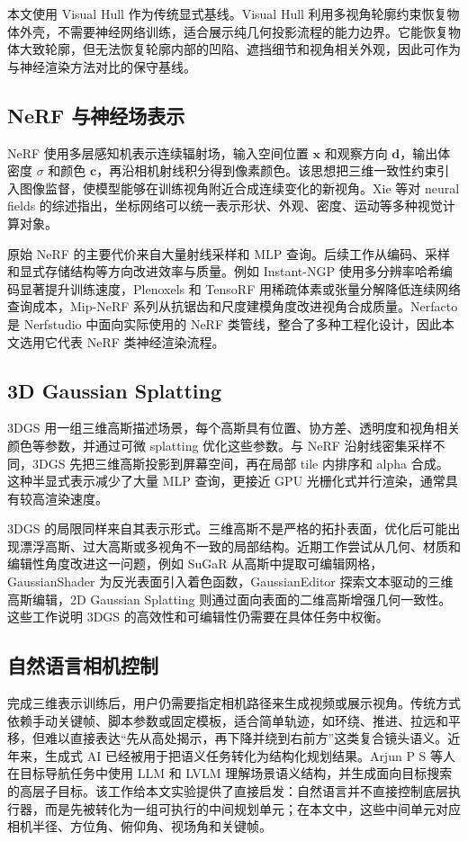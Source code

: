 \documentclass[a4paper, 12pt, centering]{article}
\begin{document}
本文使用 Visual Hull 作为传统显式基线。Visual Hull 利用多视角轮廓约束恢复物体外壳，不需要神经网络训练，适合展示纯几何投影流程的能力边界。它能恢复物体大致轮廓，但无法恢复轮廓内部的凹陷、遮挡细节和视角相关外观，因此可作为与神经渲染方法对比的保守基线。

\subsection{NeRF 与神经场表示}
NeRF 使用多层感知机表示连续辐射场，输入空间位置 $\mathbf{x}$ 和观察方向 $\mathbf{d}$，输出体密度 $\sigma$ 和颜色 $\mathbf{c}$，再沿相机射线积分得到像素颜色\cite{mildenhall2020nerf}。该思想把三维一致性约束引入图像监督，使模型能够在训练视角附近合成连续变化的新视角。Xie 等对 neural fields 的综述指出，坐标网络可以统一表示形状、外观、密度、运动等多种视觉计算对象\cite{xie2022neuralfields}。

原始 NeRF 的主要代价来自大量射线采样和 MLP 查询。后续工作从编码、采样和显式存储结构等方向改进效率与质量。例如 Instant-NGP 使用多分辨率哈希编码显著提升训练速度\cite{muller2022instant}，Plenoxels 和 TensoRF 用稀疏体素或张量分解降低连续网络查询成本\cite{yu2022plenoxels,chen2022tensorf}，Mip-NeRF 系列从抗锯齿和尺度建模角度改进视角合成质量\cite{barron2021mipnerf,barron2022mipnerf360,barron2023zipnerf}。Nerfacto 是 Nerfstudio 中面向实际使用的 NeRF 类管线，整合了多种工程化设计，因此本文选用它代表 NeRF 类神经渲染流程。

\subsection{3D Gaussian Splatting}
3DGS 用一组三维高斯描述场景，每个高斯具有位置、协方差、透明度和视角相关颜色等参数，并通过可微 splatting 优化这些参数\cite{kerbl2023gaussians}。与 NeRF 沿射线密集采样不同，3DGS 先把三维高斯投影到屏幕空间，再在局部 tile 内排序和 alpha 合成。这种半显式表示减少了大量 MLP 查询，更接近 GPU 光栅化式并行渲染，通常具有较高渲染速度。

3DGS 的局限同样来自其表示形式。三维高斯不是严格的拓扑表面，优化后可能出现漂浮高斯、过大高斯或多视角不一致的局部结构。近期工作尝试从几何、材质和编辑性角度改进这一问题，例如 SuGaR 从高斯中提取可编辑网格\cite{guedon2023sugar}，GaussianShader 为反光表面引入着色函数\cite{jiang2023gaussianshader}，GaussianEditor 探索文本驱动的三维高斯编辑\cite{wang2023gaussianeditor}，2D Gaussian Splatting 则通过面向表面的二维高斯增强几何一致性\cite{huang2024twodgs}。这些工作说明 3DGS 的高效性和可编辑性仍需要在具体任务中权衡。

\subsection{自然语言相机控制}
完成三维表示训练后，用户仍需要指定相机路径来生成视频或展示视角。传统方式依赖手动关键帧、脚本参数或固定模板，适合简单轨迹，如环绕、推进、拉远和平移，但难以直接表达“先从高处揭示，再下降并绕到右前方”这类复合镜头语义。近年来，生成式 AI 已经被用于把语义任务转化为结构化规划结果。Arjun P S 等人在目标导航任务中使用 LLM 和 LVLM 理解场景语义结构，并生成面向目标搜索的高层子目标\cite{arjun2024cognitive}。该工作给本文实验提供了直接启发：自然语言并不直接控制底层执行器，而是先被转化为一组可执行的中间规划单元；在本文中，这些中间单元对应相机半径、方位角、俯仰角、视场角和关键帧。
\end{document}

